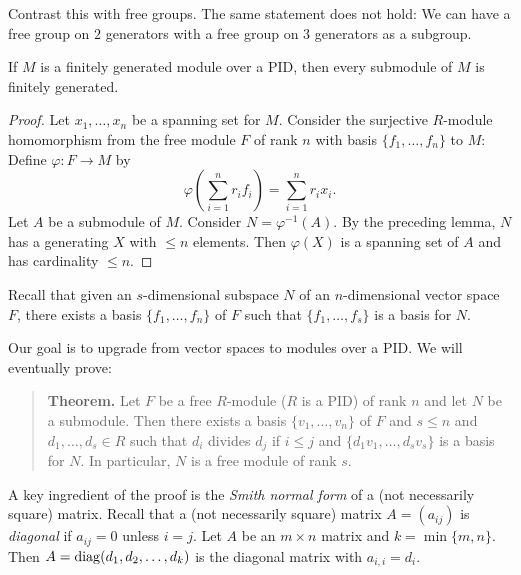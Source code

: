 \begin{remark}
  Contrast this with free groups. The same statement
  does not hold: We can have a free
  group on $2$ generators with a free group on $3$
  generators as a subgroup.
\end{remark}

\begin{corollary}
  If $M$ is a finitely generated module over a PID, then
  every submodule of $M$ is finitely generated.
\end{corollary}

\begin{proof}
  Let $x_1, \dots, x_n$ be a spanning set for $M$.
  Consider the surjective $R$-module homomorphism from the free
  module $F$ of rank $n$ with basis $\{f_1, \dots, f_n\}$
  to $M$: Define $\varphi : F \to M$ by
  \[
    \varphi\left(\sum_{i = 1}^n r_i f_i\right) = \sum_{i = 1}^n r_i x_i.
  \]
  Let $A$ be a submodule of $M$. Consider
  $N = \varphi^{-1}(A)$. By the preceding lemma, $N$
  has a generating $X$ with $\le n$ elements. Then
  $\varphi(X)$ is a spanning set of $A$ and
  has cardinality $\le n$.
\end{proof}

\begin{remark}
  Recall that given an $s$-dimensional subspace $N$ of
  an $n$-dimensional vector space $F$, there exists a
  basis $\{f_1, \dots, f_n\}$ of $F$ such that
  $\{f_1, \dots, f_s\}$ is a basis for $N$.
\end{remark}

\begin{remark}
  Our goal is to upgrade from vector spaces to modules
  over a PID. We will eventually prove:
  \begin{quote}
    \textbf{Theorem.}
    Let $F$ be a free $R$-module ($R$ is a PID) of rank $n$ and let
    $N$ be a submodule. Then there exists a basis
    $\{v_1, \dots, v_n\}$ of $F$ and $s \le n$ and
    $d_1, \dots, d_s \in R$ such that $d_i$ divides
    $d_j$ if $i \le j$ and $\{d_1 v_1, \dots, d_s v_s\}$
    is a basis for $N$. In particular, $N$ is a free
    module of rank $s$.
  \end{quote}
  A key ingredient of the proof is the \emph{Smith normal form}
  of a (not necessarily square) matrix. Recall that
  a (not necessarily square) matrix $A = (a_{ij})$
  is \emph{diagonal} if $a_{ij} = 0$ unless $i = j$.
  Let $A$ be an $m \times n$ matrix and $k = \min\{m, n\}$.
  Then $A = \operatorname{diag}(d_1, d_2, \dots, d_k)$ is the diagonal
  matrix with $a_{i, i} = d_i$.
\end{remark}

